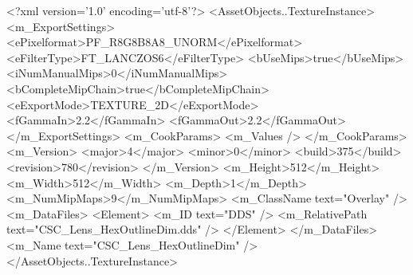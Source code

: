 <?xml version='1.0' encoding='utf-8'?>
<AssetObjects..TextureInstance>
  <m_ExportSettings>
    <ePixelformat>PF_R8G8B8A8_UNORM</ePixelformat>
    <eFilterType>FT_LANCZOS6</eFilterType>
    <bUseMips>true</bUseMips>
    <iNumManualMips>0</iNumManualMips>
    <bCompleteMipChain>true</bCompleteMipChain>
    <eExportMode>TEXTURE_2D</eExportMode>
    <fGammaIn>2.2</fGammaIn>
    <fGammaOut>2.2</fGammaOut>
  </m_ExportSettings>
  <m_CookParams>
    <m_Values />
  </m_CookParams>
  <m_Version>
    <major>4</major>
    <minor>0</minor>
    <build>375</build>
    <revision>780</revision>
  </m_Version>
  <m_Height>512</m_Height>
  <m_Width>512</m_Width>
  <m_Depth>1</m_Depth>
  <m_NumMipMaps>9</m_NumMipMaps>
  <m_ClassName text="Overlay" />
  <m_DataFiles>
    <Element>
      <m_ID text="DDS" />
      <m_RelativePath text="CSC_Lens_HexOutlineDim.dds" />
    </Element>
  </m_DataFiles>
  <m_Name text="CSC_Lens_HexOutlineDim" />
</AssetObjects..TextureInstance>
